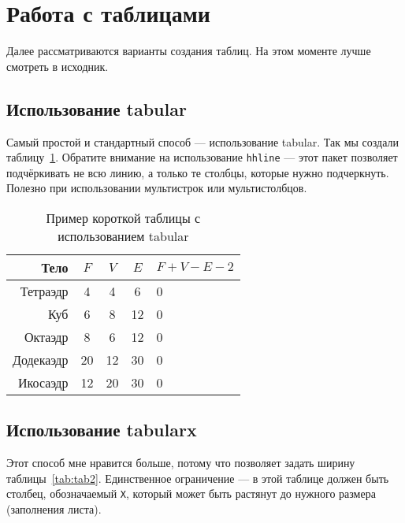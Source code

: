 \section{Работа с таблицами}

Далее рассматриваются варианты создания таблиц. На этом моменте лучше смотреть в исходник.

\subsection{Использование tabular}

Самый простой и стандартный способ --- использование tabular. Так мы создали таблицу~\ref{tab:tab1}. Обратите внимание на использование \texttt{hhline} --- этот пакет позволяет подчёркивать не всю линию, а только те столбцы, которые нужно подчеркнуть. Полезно при использовании мультистрок или мультистолбцов.

\begin{table}    
    \caption{Пример короткой таблицы с использованием tabular}
    \begin{tabular}{|r|c|c|c|l|}\hline
    Тело      & $F$ & $V$  & $E$ & $F+V-E-2$ \\ \hline
    Тетраэдр  & 4   & 4    & 6   & 0         \\ \hhline{~-~-~}
    Куб       & 6   & 8    & 12  & 0         \\ \hhline{--~~~}
    Октаэдр   & 8   & 6    & 12  & 0         \\ \hhline{-----}
    Додекаэдр & 20  & 12   & 30  & 0         \\ \hline
    Икосаэдр  & 12  & 20   & 30  & 0         \\ \hline
    \end{tabular}
    \label{tab:tab1}
\end{table}

\subsection{Использование tabularx}

Этот способ мне нравится больше, потому что позволяет задать ширину таблицы~\ref{tab:tab2}. Единственное ограничение --- в этой таблице должен быть столбец, обозначаемый \texttt{X}, который может быть растянут до нужного размера (заполнения листа).

